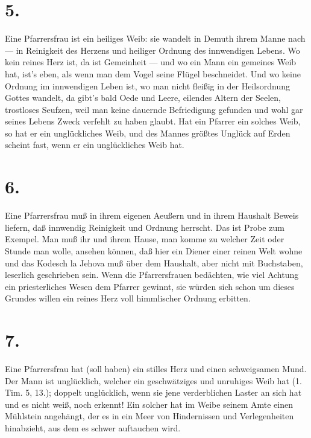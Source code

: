 \section{5.}

Eine Pfarrersfrau ist ein heiliges Weib: sie wandelt in Demuth ihrem Manne nach — in Reinigkeit des Herzens und heiliger Ordnung des innwendigen Lebens. Wo kein reines Herz ist, da ist Gemeinheit — und wo ein Mann ein gemeines Weib hat, ist’s eben, als wenn man dem Vogel seine Flügel beschneidet. Und wo keine Ordnung im innwendigen Leben ist, wo man nicht fleißig in der Heilsordnung Gottes wandelt, da gibt’s bald Oede und Leere, eilendes Altern der Seelen, trostloses Seufzen, weil man keine dauernde Befriedigung gefunden und wohl gar seines Lebens Zweck verfehlt zu haben glaubt. Hat ein Pfarrer ein solches Weib, so hat er ein unglückliches Weib, und des Mannes größtes Unglück auf Erden scheint fast, wenn er ein unglückliches Weib hat.

\section{6.}

Eine Pfarrersfrau muß in ihrem eigenen Aeußern und in ihrem Haushalt Beweis liefern, daß innwendig Reinigkeit und Ordnung herrscht. Das ist Probe zum Exempel. Man muß ihr und ihrem Hause, man komme zu welcher Zeit oder Stunde man wolle, ansehen können, daß hier ein Diener einer reinen Welt wohne und das Kodesch la Jehova
muß über dem Haushalt, aber nicht mit Buchstaben, leserlich geschrieben sein. Wenn die Pfarrersfrauen bedächten, wie viel Achtung ein priesterliches Wesen dem Pfarrer gewinnt, sie würden sich schon um dieses Grundes willen ein reines Herz voll himmlischer Ordnung erbitten.

\section{7.}

Eine Pfarrersfrau hat (soll haben) ein stilles Herz und einen schweigsamen Mund. Der Mann ist unglücklich, welcher ein geschwätziges und unruhiges Weib hat (1. Tim. 5, 13.); doppelt unglücklich, wenn sie jene verderblichen Laster an sich hat und es nicht weiß, noch erkennt! Ein solcher hat im Weibe seinem Amte einen Mühlstein angehängt, der es in ein Meer von Hindernissen und Verlegenheiten hinabzieht, aus dem es schwer auftauchen wird.

